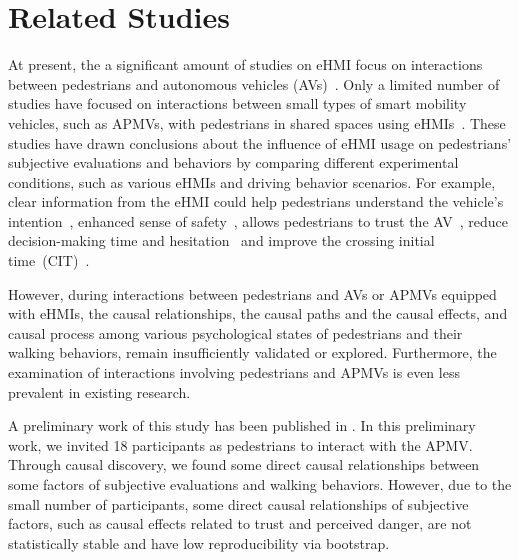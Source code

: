 \section{Related Studies}
At present, the a significant amount of studies on eHMI focus on interactions between pedestrians and autonomous vehicles (AVs)~\citep{chang2017eyes, Clercq2019eHMI,  loew2022go, lee2022learning, dey2021communicating}. 
Only a limited number of studies have focused on interactions between small types of smart mobility vehicles, such as APMVs, with pedestrians in shared spaces using eHMIs~\citep{zhang2024shared,liehr2024you,liu2024_APMV_eHMI}.
These studies have drawn conclusions about the influence of eHMI usage on pedestrians' subjective evaluations and behaviors by comparing different experimental conditions, such as various eHMIs and driving behavior scenarios.
For example, clear information from the eHMI could help pedestrians understand the vehicle's intention~\citep{liu2021importance,dey2021communicating,liehr2024you}, enhanced sense of safety~\citep{faas2020external,liu2021importance,Clercq2019eHMI}, allows pedestrians to trust the AV~\citep{faas2020external, liu2021importance,dey2021communicating}, reduce decision-making time and hesitation~\citep{chang2017eyes,liu2021importance} and improve the crossing initial time~(CIT)~\citep{loew2022go,lee2022learning}.



However, during interactions between pedestrians and AVs or APMVs equipped with eHMIs, the causal relationships, \ie the causal paths and the causal effects,  and causal process among various psychological states of pedestrians and their walking behaviors, remain insufficiently validated or explored.
Furthermore, the examination of interactions involving pedestrians and APMVs is even less prevalent in existing research.


A preliminary work of this study has been published in \citep{liu2024causal}.
In this preliminary work, we invited 18 participants as pedestrians to interact with the APMV. 
Through causal discovery, we found some direct causal relationships between some factors of subjective evaluations and walking behaviors.
However, due to the small number of participants, some direct causal relationships of subjective factors, such as causal effects related to trust and perceived danger, are not statistically stable and have low reproducibility via bootstrap.